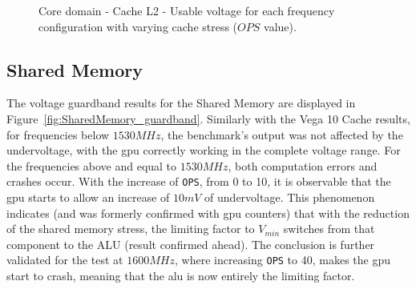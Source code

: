 \begin{figure}[!htb]
    \centering
    \begin{subfigmatrix}{2}
      \label{fig:CacheL2_guardband}
    \end{subfigmatrix}
    \caption{Core domain - Cache L2 - Usable voltage for each frequency configuration with varying cache stress ($OPS$ value).}
\end{figure}


\subsection{Shared Memory}

\label{sec:cache_guardband}

The voltage guardband results for the Shared Memory are displayed in Figure~\ref{fig:SharedMemory_guardband}. Similarly with the Vega 10 Cache results, for frequencies below $1530MHz$, the benchmark's output was not affected by the undervoltage, with the \acrshort{gpu} correctly working in the complete voltage range. For the frequencies above and equal to $1530MHz$, both computation errors and crashes occur. With the increase of \texttt{OPS}, from 0 to 10, it is observable that the \acrshort{gpu} starts to allow an increase of $10mV$ of undervoltage. This phenomenon indicates (and was formerly confirmed with \acrshort{gpu} counters) that with the reduction of the shared memory stress, the limiting factor to $V_{min}$ switches from that component to the ALU (result confirmed ahead). The conclusion is further validated for the test at $1600MHz$, where increasing  \texttt{OPS} to 40, makes the \acrshort{gpu} start to crash, meaning that the \acrshort{alu} is now entirely the limiting factor.


